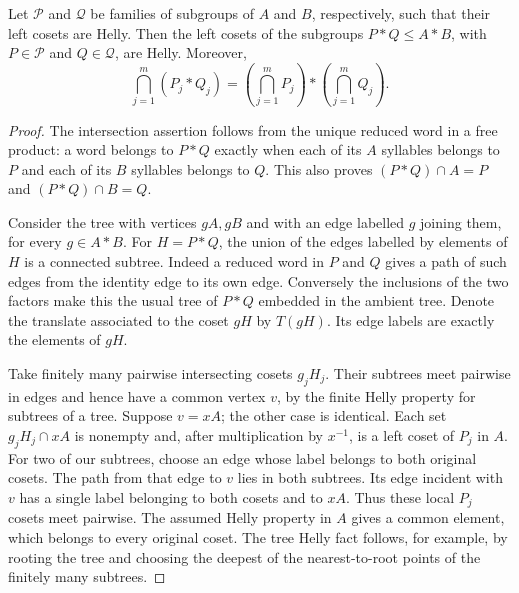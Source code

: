\begin{lemma}\label{lem:free-helly}
Let $\mathcal P$ and $\mathcal Q$ be families of subgroups of $A$ and
$B$, respectively, such that their left cosets are Helly. Then the
left cosets of the subgroups $P*Q\leq A*B$, with
$P\in\mathcal P$ and $Q\in\mathcal Q$, are Helly. Moreover,
\[
 \bigcap_{j=1}^m(P_j*Q_j)
   =\left(\bigcap_{j=1}^mP_j\right)*
     \left(\bigcap_{j=1}^mQ_j\right).
\]
\end{lemma}
\begin{proof}
The intersection assertion follows from the unique reduced word in a
free product: a word belongs to $P*Q$ exactly when each of its
$A$ syllables belongs to $P$ and each of its $B$ syllables belongs to
$Q$. This also proves $(P*Q)\cap A=P$ and $(P*Q)\cap B=Q$.

Consider the tree with vertices $gA,gB$ and with an edge labelled $g$
joining them, for every $g\in A*B$. For $H=P*Q$, the union of the
edges labelled by elements of $H$ is a connected subtree. Indeed a
reduced word in $P$ and $Q$ gives a path of such edges from the
identity edge to its own edge. Conversely the inclusions of the two
factors make this the usual tree of $P*Q$ embedded in the ambient
tree. Denote the translate associated to the coset $gH$ by $T(gH)$.
Its edge labels are exactly the elements of $gH$.

Take finitely many pairwise intersecting cosets $g_jH_j$. Their
subtrees meet pairwise in edges and hence have a common vertex $v$,
by the finite Helly property for subtrees of a tree. Suppose
$v=xA$; the other case is identical. Each set
$g_jH_j\cap xA$ is nonempty and, after multiplication by $x^{-1}$,
is a left coset of $P_j$ in $A$. For two of our subtrees, choose an
edge whose label belongs to both original cosets. The path from that
edge to $v$ lies in both subtrees. Its edge incident with $v$ has a
single label belonging to both cosets and to $xA$. Thus these local
$P_j$ cosets meet pairwise. The assumed Helly property in $A$ gives a
common element, which belongs to every original coset. The tree
Helly fact follows, for example, by rooting the tree and choosing the
deepest of the nearest-to-root points of the finitely many subtrees.
\end{proof}

